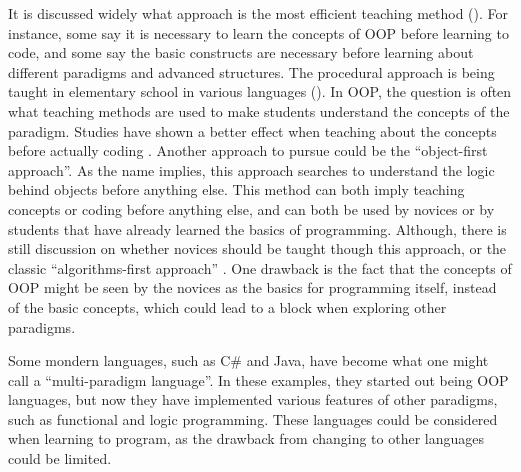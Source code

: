 It is discussed widely what approach is the most efficient teaching method (). For instance, some say it is necessary to learn the concepts of OOP before learning to code, and some say the basic constructs are necessary before learning about different paradigms and advanced structures. The procedural approach is being taught in elementary school in various languages (). In OOP, the question is often what teaching methods are used to make students understand the concepts of the paradigm. Studies have shown a better effect when teaching about the concepts before actually coding \cite{Xinogalos15}. Another approach to pursue could be the ``object-first approach''. As the name implies, this approach searches to understand the logic behind objects before anything else. This method can both imply teaching concepts or coding before anything else, and can both be used by novices or by students that have already learned the basics of programming. Although, there is still discussion on whether novices should be taught though this approach, or the classic ``algorithms-first approach'' \cite{Periyamasy12}. One drawback is the fact that the concepts of OOP might be seen by the novices as the basics for programming itself, instead of the basic concepts, which could lead to a block when exploring other paradigms.

Some mondern languages, such as C# and Java, have become what one might call a ``multi-paradigm language''. In these examples, they started out being OOP languages, but now they have implemented various features of other paradigms, such as functional and logic programming. These languages could be considered when learning to program, as the drawback from changing to other languages could be limited.